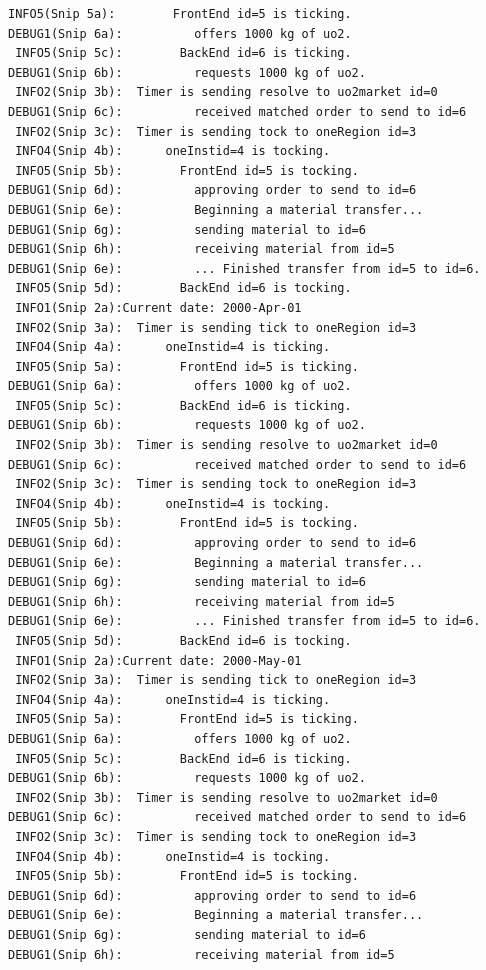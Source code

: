 \documentclass[letterpaper,10pt,english]{sphinxmanual}
\begin{document}
\begin{Verbatim}[commandchars=\\\{\}]
 INFO5(Snip 5a):        FrontEnd id=5 is ticking.
DEBUG1(Snip 6a):          offers 1000 kg of uo2.
 INFO5(Snip 5c):        BackEnd id=6 is ticking.
DEBUG1(Snip 6b):          requests 1000 kg of uo2.
 INFO2(Snip 3b):  Timer is sending resolve to uo2market id=0
DEBUG1(Snip 6c):          received matched order to send to id=6
 INFO2(Snip 3c):  Timer is sending tock to oneRegion id=3
 INFO4(Snip 4b):      oneInstid=4 is tocking.
 INFO5(Snip 5b):        FrontEnd id=5 is tocking.
DEBUG1(Snip 6d):          approving order to send to id=6
DEBUG1(Snip 6e):          Beginning a material transfer...
DEBUG1(Snip 6g):          sending material to id=6
DEBUG1(Snip 6h):          receiving material from id=5
DEBUG1(Snip 6e):          ... Finished transfer from id=5 to id=6.
 INFO5(Snip 5d):        BackEnd id=6 is tocking.
 INFO1(Snip 2a):Current date: 2000-Apr-01
 INFO2(Snip 3a):  Timer is sending tick to oneRegion id=3
 INFO4(Snip 4a):      oneInstid=4 is ticking.
 INFO5(Snip 5a):        FrontEnd id=5 is ticking.
DEBUG1(Snip 6a):          offers 1000 kg of uo2.
 INFO5(Snip 5c):        BackEnd id=6 is ticking.
DEBUG1(Snip 6b):          requests 1000 kg of uo2.
 INFO2(Snip 3b):  Timer is sending resolve to uo2market id=0
DEBUG1(Snip 6c):          received matched order to send to id=6
 INFO2(Snip 3c):  Timer is sending tock to oneRegion id=3
 INFO4(Snip 4b):      oneInstid=4 is tocking.
 INFO5(Snip 5b):        FrontEnd id=5 is tocking.
DEBUG1(Snip 6d):          approving order to send to id=6
DEBUG1(Snip 6e):          Beginning a material transfer...
DEBUG1(Snip 6g):          sending material to id=6
DEBUG1(Snip 6h):          receiving material from id=5
DEBUG1(Snip 6e):          ... Finished transfer from id=5 to id=6.
 INFO5(Snip 5d):        BackEnd id=6 is tocking.
 INFO1(Snip 2a):Current date: 2000-May-01
 INFO2(Snip 3a):  Timer is sending tick to oneRegion id=3
 INFO4(Snip 4a):      oneInstid=4 is ticking.
 INFO5(Snip 5a):        FrontEnd id=5 is ticking.
DEBUG1(Snip 6a):          offers 1000 kg of uo2.
 INFO5(Snip 5c):        BackEnd id=6 is ticking.
DEBUG1(Snip 6b):          requests 1000 kg of uo2.
 INFO2(Snip 3b):  Timer is sending resolve to uo2market id=0
DEBUG1(Snip 6c):          received matched order to send to id=6
 INFO2(Snip 3c):  Timer is sending tock to oneRegion id=3
 INFO4(Snip 4b):      oneInstid=4 is tocking.
 INFO5(Snip 5b):        FrontEnd id=5 is tocking.
DEBUG1(Snip 6d):          approving order to send to id=6
DEBUG1(Snip 6e):          Beginning a material transfer...
DEBUG1(Snip 6g):          sending material to id=6
DEBUG1(Snip 6h):          receiving material from id=5

\end{Verbatim}
\end{document}
